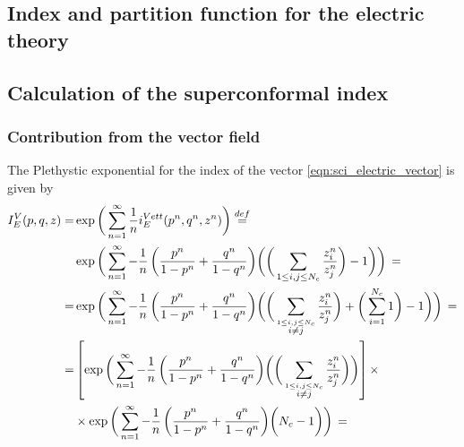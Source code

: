 \begin{appendices}
\newpage

\chapter[Index and PF for the electric theory]{Index and 
partition function  for the electric theory}
\label{appendix:index_electric}
\section{Calculation of the superconformal index}
\subsection{Contribution from the vector field}
The Plethystic exponential for the index of the vector \eqref{eqn:sci_electric_vector} is given by
\begin{equation}
\begin{aligned}
I_E^V(p,q,z) = &\exp \bigg( \sum_{n=1}^{\infty} {1 \over n} i_E^{Vett} (p^n,q^n,z^n) \bigg) \overset{def}{=} \\
 &\exp \bigg( \sum_{n=1}^{\infty} - {1 \over n} \, \bigg( {p^n \over 1-p^n} + {q^n \over 1-q^n} \bigg)  \bigg(\bigg( \sum_{ 1 \leq i,j \leq N_c}  {z_i^n \over z_j^n}  \bigg)- 1 \bigg) \bigg) \, = \\
 =&\exp \bigg( \sum_{n=1}^{\infty} - {1 \over n} \, \bigg( {p^n \over 1-p^n} + {q^n \over 1-q^n} \bigg)  \bigg( \bigg( \sum_{\overset{ 1 \leq i,j \leq N_c}{i \neq j}}  {z_i^n \over z_j^n} \bigg) + \bigg( \sum_{i=1}^{N_c} 1 \bigg)- 1 \bigg) \bigg) \, = \\
=&
\left[  \exp \bigg( \sum_{n=1}^{\infty} - {1 \over n} \, \bigg( {p^n \over 1-p^n} + {q^n \over 1-q^n} \bigg)  \bigg( \bigg( \sum_{\overset{ 1 \leq i,j \leq N_c}{i \neq j}}  {z_i^n \over z_j^n} \bigg) \bigg)\right] \times \\
	&   \times \exp \bigg( \sum_{n=1}^{\infty} - {1 \over n} \, \bigg( {p^n \over 1-p^n} + {q^n \over 1-q^n} \bigg)  \bigg( N_c - 1 \bigg) \bigg) \, = 
\\

\end{aligned}
\end{equation}
\end{appendices}
